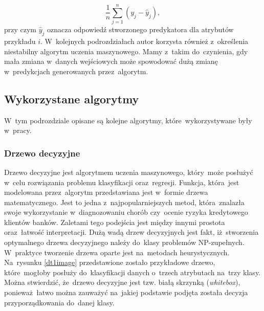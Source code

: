 \begin{equation}
\frac{1}{n} \sum_{j=1}^{n}(y_j - \hat{y}_j), 
\end{equation}
przy czym $\hat{y}_j$ oznacza odpowiedź stworzonego predykatora dla atrybutów przykładu $i$.
W~kolejnych podrozdziałach autor korzysta również z~określenia niestabilny algorytm uczenia maszynowego. Mamy z~takim do~czynienia, gdy mała zmiana w~danych wejściowych może spowodować dużą zmianę w~predykcjach generowanych przez~algorytm\cite{ensemble}.

\subsection{Wykorzystane algorytmy}
W~tym podrozdziale opisane są kolejne algorytmy, które~wykorzystywane były w~pracy.
\subsubsection{Drzewo decyzyjne}
Drzewo decyzyjne jest algorytmem uczenia maszynowego, który~może posłużyć w~celu rozwiązania problemu klasyfikacji oraz~regresji. Funkcja, która~jest modelowana przez~algorytm przedstawiana jest w~formie drzewa matematycznego. Jest to jedna z~najpopularniejszych metod, która~znalazła swoje wykorzystanie w~diagnozowaniu chorób czy~ocenie ryzyka kredytowego klientów banków\cite{mitchel}. Zaletami tego podejścia jest między innymi  prostota oraz~łatwość interpretacji. Dużą wadą drzew decyzyjnych jest fakt, iż~stworzenia optymalnego drzewa decyzyjnego należy do~klasy problemów NP-zupełnych. W~praktyce tworzenie drzewa oparte jest na~metodach heurystycznych\cite{dtscikit}. Na~rysunku \ref{dt1image} przedstawione zostało przykładowe drzewo, które~mogłoby posłuży do~klasyfikacji danych o~trzech atrybutach na~trzy klasy. Można stwierdzić, że~drzewo decyzyjne jest tzw. białą skrzynką (\textit{whitebox}), ponieważ~łatwo można zauważyć na~jakiej podstawie podjęta została decyzja przyporządkowania do~danej klasy.

